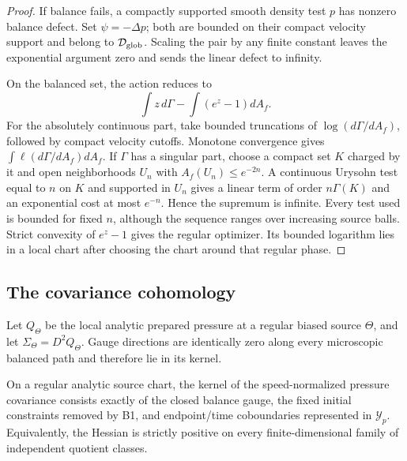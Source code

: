 \begin{proof}
If balance fails, a compactly supported smooth density test \(p\) has nonzero
balance defect.  Set \(\psi=-\Delta p\); both are bounded on their compact
velocity support and belong to \(\mathcal D_{\rm glob}\).  Scaling the pair by
any finite constant leaves the exponential argument zero and sends the linear
defect to infinity.

On the balanced set, the action reduces to
\[
\int z\,d\Gamma-\int(e^z-1)dA_f.
\]
For the absolutely continuous part, take bounded truncations of
\(\log(d\Gamma/dA_f)\), followed by compact velocity cutoffs.  Monotone
convergence gives \(\int\ell(d\Gamma/dA_f)dA_f\).  If \(\Gamma\) has a
singular part, choose a compact set \(K\) charged by it and open
neighborhoods \(U_n\) with \(A_f(U_n)\le e^{-2n}\).  A continuous Urysohn
test equal to \(n\) on \(K\) and supported in \(U_n\) gives a linear term of
order \(n\Gamma(K)\) and an exponential cost at most \(e^{-n}\).  Hence the
supremum is infinite.  Every test used is bounded for fixed \(n\), although
the sequence ranges over increasing source balls.  Strict convexity of
\(e^z-1\) gives the regular optimizer.  Its bounded logarithm lies in a local
chart after choosing the chart around that regular phase.
\end{proof}

\subsection{The covariance cohomology}

Let \(Q_\Theta\) be the local analytic prepared pressure at a regular biased
source \(\Theta\), and let
\(\Sigma_\Theta=D^2Q_\Theta\).  Gauge directions are identically zero along
every microscopic balanced path and therefore lie in its kernel.

\begin{theorem}
\label{thm:r6-b3-kernel}
On a regular analytic source chart, the kernel of the speed-normalized
pressure covariance consists exactly of the closed balance gauge, the fixed
initial constraints removed by B1, and endpoint/time coboundaries represented
in \(\mathcal Y_p\).  Equivalently, the Hessian is strictly positive on every
finite-dimensional family of independent quotient classes.
\end{theorem}

